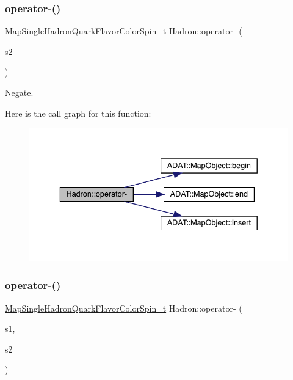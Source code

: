 \subsubsection{\texorpdfstring{operator-\/()}{operator-()}\hspace{0.1cm}{\footnotesize\ttfamily [5/6]}}
{\footnotesize\ttfamily \mbox{\hyperlink{namespaceHadron_a03b319764f85c20434f20a269ce5f388}{Map\+Single\+Hadron\+Quark\+Flavor\+Color\+Spin\+\_\+t}} Hadron\+::operator-\/ (\begin{DoxyParamCaption}\item[{const \mbox{\hyperlink{namespaceHadron_a03b319764f85c20434f20a269ce5f388}{Map\+Single\+Hadron\+Quark\+Flavor\+Color\+Spin\+\_\+t}} \&}]{s2 }\end{DoxyParamCaption})}



Negate. 

Here is the call graph for this function\+:\nopagebreak
\begin{figure}[H]
\begin{center}
\leavevmode
\includegraphics[width=336pt]{d1/daf/namespaceHadron_a2cee38a50a5e1ed5fbff1d9e4df08bdd_cgraph}
\end{center}
\end{figure}
\mbox{\label{namespaceHadron_ad7c424c3185becdcc1423060951ff98e}} 
\subsubsection{\texorpdfstring{operator-\/()}{operator-()}\hspace{0.1cm}{\footnotesize\ttfamily [6/6]}}
{\footnotesize\ttfamily \mbox{\hyperlink{namespaceHadron_a03b319764f85c20434f20a269ce5f388}{Map\+Single\+Hadron\+Quark\+Flavor\+Color\+Spin\+\_\+t}} Hadron\+::operator-\/ (\begin{DoxyParamCaption}\item[{const \mbox{\hyperlink{namespaceHadron_a03b319764f85c20434f20a269ce5f388}{Map\+Single\+Hadron\+Quark\+Flavor\+Color\+Spin\+\_\+t}} \&}]{s1,  }\item[{const \mbox{\hyperlink{namespaceHadron_a03b319764f85c20434f20a269ce5f388}{Map\+Single\+Hadron\+Quark\+Flavor\+Color\+Spin\+\_\+t}} \&}]{s2 }\end{DoxyParamCaption})}



